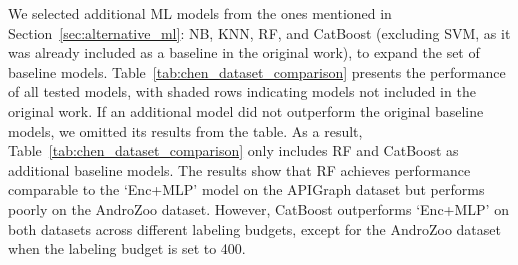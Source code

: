 We selected additional ML models from the ones
mentioned in Section~\ref{sec:alternative_ml}: NB, KNN, RF, and CatBoost
(excluding SVM, as it was already included as a baseline in the
original work), to expand the set of baseline models. Table~\ref{tab:chen_dataset_comparison} presents
the performance of all tested models, with shaded rows indicating
models not included in the original work. If an additional model did
not outperform the original baseline models, we omitted its results
from the table. As a result, Table~\ref{tab:chen_dataset_comparison} only includes RF and CatBoost as
additional baseline models. The results show that RF achieves
performance comparable to the ‘Enc+MLP’ model on the APIGraph dataset
but performs poorly on the AndroZoo dataset. However, CatBoost
outperforms ‘Enc+MLP’ on both datasets across different labeling
budgets, except for the AndroZoo dataset when the labeling budget is
set to 400.


